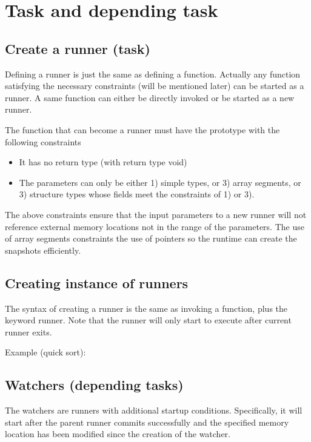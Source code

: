 \documentclass[a4paper]{article}
\DeclareRobustCommand{\mybox}[2][gray!20]{%
\begin{tcolorbox}[   %
        breakable,
        left=0pt,
        right=0pt,
        top=0pt,
        bottom=0pt,
        colback=#1,
        colframe=#1,
        width=\dimexpr\textwidth\relax, 
        enlarge left by=0mm,
        boxsep=5pt,
        arc=0pt,outer arc=0pt,
        ]
        #2
\end{tcolorbox}
}
\begin{document}
{\color{darkblue}\section{Task and depending task}}

{\color{lightblue}\subsection{Create a runner (task)}}

Defining a runner is just the same as defining a function. Actually any function satisfying the necessary constraints (will be mentioned later) can be started as a runner. A same function can either be directly invoked or be started as a new runner.

The function that can become a runner must have the prototype with the following constraints

\begin{itemize}
	\item It has no return type (with return type void)
	\item The parameters can only be either 1) simple types, or 3) array segments, or 3) structure types whose fields meet the constraints of 1) or 3).
\end{itemize}

The above constraints ensure that the input parameters to a new runner will not reference external memory locations not in the range of the parameters. The use of array segments constraints the use of pointers so the runtime can create the snapshots efficiently.

{\color{lightblue}\subsection{Creating instance of runners}}

The syntax of creating a runner is the same as invoking a function, plus the keyword runner. Note that the runner will only start to execute after current runner exits.

Example (quick sort):

\mybox[gray!20]
{\color{blue}{}}

{\color{lightblue}\subsection{Watchers (depending tasks)}}

The watchers are runners with additional startup conditions. Specifically, it will start after the parent runner commits successfully and the specified memory location has been modified since the creation of the watcher.
\end{document}
